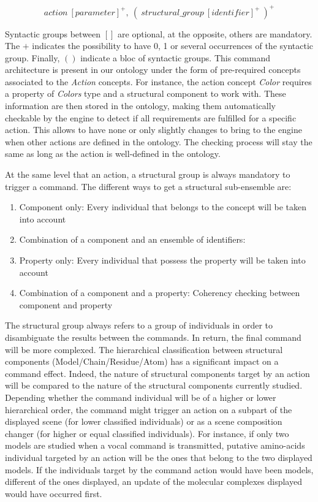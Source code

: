 \documentclass{vgtc}                          %
\begin{document}
$$action\ [parameter]^+,\ (\ structural\_group\ [identifier]^+\ )^+$$

Syntactic groups between $[]$ are optional, at the opposite, others are mandatory. The $+$ indicates the possibility to have 0, 1 or several occurrences of the syntactic group. Finally, $()$ indicate a bloc of syntactic groups. This command architecture is present in our ontology under the form of pre-required concepts associated to the \textit{Action} concepts. For instance, the action concept \textit{Color} requires a property of \textit{Colors} type and a structural component to work with. These information are then stored in the ontology, making them automatically checkable by the engine to detect if all requirements are fulfilled for a specific action. This allows to have none or only slightly changes to bring to the engine when other actions are defined in the ontology. The checking process will stay the same as long as the action is well-defined in the ontology.

At the same level that an action, a structural group is always mandatory to trigger a command. The different ways to get a structural sub-ensemble are:

\begin{enumerate}
  \item Component only: Every individual that belongs to the concept will be taken into account
  \item Combination of a component and an ensemble of identifiers: 
  \item Property only: Every individual that possess the property will be taken into account
  \item Combination of a component and a property: Coherency checking between component and property
\end{enumerate}

The structural group always refers to a group of individuals in order to disambiguate the results between the commands. In return, the final command will be more complexed.
The hierarchical classification between structural components (Model/Chain/Residue/Atom) has a significant impact on a command effect. Indeed, the nature of structural components target by an action will be compared to the nature of the structural components currently studied. Depending whether the command individual will be of a higher or lower hierarchical order, the command might trigger an action on a subpart of the displayed scene (for lower classified individuals) or as a scene composition changer (for higher or equal classified individuals).
For instance, if only two models are studied when a vocal command is transmitted, putative amino-acids individual targeted by an action will be the ones that belong to the two displayed models. If the individuals target by the command action would have been models, different of the ones displayed, an update of the molecular complexes displayed would have occurred first.
\end{document}
